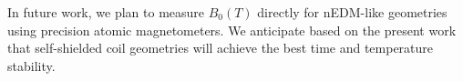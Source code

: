 In future work, we plan to measure $B_0(T)$ directly for nEDM-like
geometries using precision atomic magnetometers.  We anticipate based
on the present work that self-shielded coil geometries will achieve
the best time and temperature stability.
















